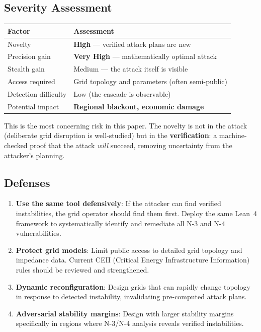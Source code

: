 \documentclass[11pt,a4paper]{article}
\begin{document}
\subsection{Severity Assessment}

\begin{center}
\begin{tabular}{@{}ll@{}}
\toprule
\textbf{Factor} & \textbf{Assessment} \\
\midrule
Novelty & \textbf{High} --- verified attack plans are new \\
Precision gain & \textbf{Very High} --- mathematically optimal attack \\
Stealth gain & Medium --- the attack itself is visible \\
Access required & Grid topology and parameters (often semi-public) \\
Detection difficulty & Low (the cascade is observable) \\
Potential impact & \textbf{Regional blackout, economic damage} \\
\bottomrule
\end{tabular}
\end{center}

This is the most concerning risk in this paper. The novelty is not
in the attack (deliberate grid disruption is well-studied) but in
the \textbf{verification}: a machine-checked proof that the attack
\emph{will} succeed, removing uncertainty from the attacker's
planning.

\subsection{Defenses}

\begin{enumerate}
  \item \textbf{Use the same tool defensively}: If the attacker can
    find verified instabilities, the grid operator should find them
    first. Deploy the same Lean~4 framework to systematically
    identify and remediate all N-3 and N-4 vulnerabilities.
  \item \textbf{Protect grid models}: Limit public access to
    detailed grid topology and impedance data. Current CEII
    (Critical Energy Infrastructure Information) rules should be
    reviewed and strengthened.
  \item \textbf{Dynamic reconfiguration}: Design grids that can
    rapidly change topology in response to detected instability,
    invalidating pre-computed attack plans.
  \item \textbf{Adversarial stability margins}: Design with larger
    stability margins specifically in regions where N-3/N-4
    analysis reveals verified instabilities.
\end{enumerate}
\end{document}
